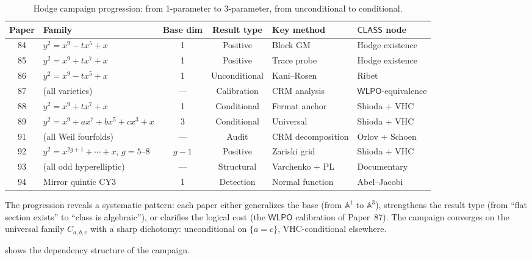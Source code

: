\documentclass[11pt]{article}
\theoremstyle{plain}
\theoremstyle{definition}
\theoremstyle{remark}
\newcommand{\Aff}{\mathbb{A}}
\newcommand{\WLPO}{\mathsf{WLPO}}
\newcommand{\CLASS}{\mathsf{CLASS}}
\begin{document}
\begin{table}[ht]
\centering
\small
\caption{Hodge campaign progression: from 1-parameter to
  3-parameter, from unconditional to conditional.}\label{tab:campaign-progression}
\begin{tabular}{@{}clccll@{}}
\toprule
Paper & Family & Base dim & Result type & Key method & $\CLASS$ node \\
\midrule
84 & $y^2 = x^9 - tx^5 + x$ & 1 & Positive & Block GM & Hodge existence \\
85 & $y^2 = x^9 + tx^7 + x$ & 1 & Positive & Trace probe & Hodge existence \\
86 & $y^2 = x^9 - tx^5 + x$ & 1 & Unconditional & Kani--Rosen & Ribet \\
87 & (all varieties) & --- & Calibration & CRM analysis & $\WLPO$-equivalence \\
88 & $y^2 = x^9 + tx^7 + x$ & 1 & Conditional & Fermat anchor & Shioda + VHC \\
89 & $y^2 = x^9 + ax^7 + bx^5 + cx^3 + x$ & 3 & Conditional & Universal & Shioda + VHC \\
91 & (all Weil fourfolds) & --- & Audit & CRM decomposition & Orlov + Schoen \\
92 & $y^2 = x^{2g+1} + \cdots + x$, $g = 5$--$8$ & $g-1$ & Positive & Zariski grid & Shioda + VHC \\
93 & (all odd hyperelliptic) & --- & Structural & Varchenko + PL & Documentary \\
94 & Mirror quintic CY3 & 1 & Detection & Normal function & Abel--Jacobi \\
\bottomrule
\end{tabular}
\end{table}

The progression reveals a systematic pattern: each paper either
generalizes the base (from $\Aff^1$ to $\Aff^3$), strengthens the
result type (from ``flat section exists'' to ``class is algebraic''),
or clarifies the logical cost (the $\WLPO$ calibration of Paper~87).
The campaign converges on the universal family $C_{a,b,c}$ with a
sharp dichotomy: unconditional on $\{a = c\}$, VHC-conditional
elsewhere.

 shows the dependency structure of the campaign.
\end{document}
